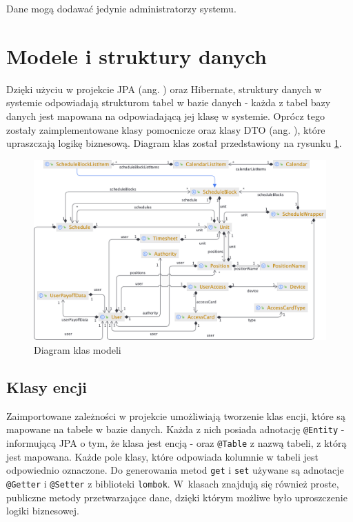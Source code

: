 Dane mogą dodawać jedynie administratorzy systemu.

\section{Modele i struktury danych}


Dzięki użyciu w projekcie JPA (ang. ) oraz Hibernate, struktury danych w systemie odpowiadają strukturom tabel w bazie danych - każda z tabel bazy danych jest mapowana na odpowiadającą jej klasę w systemie. Oprócz tego zostały zaimplementowane klasy pomocnicze oraz klasy DTO (ang. ), które upraszczają logikę biznesową. Diagram klas został przedstawiony na rysunku \ref{fig:entityDiagram}.

\begin{figure}
    \centering
    \includegraphics[width=\textwidth]{graf/classDiagram.png}
    \caption{Diagram klas modeli}
    \label{fig:entityDiagram}
\end{figure}

\subsection{Klasy encji}

Zaimportowane zależności w projekcie umożliwiają tworzenie klas encji, które są mapowane na tabele w bazie danych. Każda z nich posiada adnotację \texttt{@Entity} - informującą JPA o tym, że klasa jest encją - oraz \texttt{@Table} z nazwą tabeli, z którą jest mapowana. Każde pole klasy, które odpowiada kolumnie w tabeli jest odpowiednio oznaczone. Do generowania metod \texttt{get} i \texttt{set} używane są adnotacje \texttt{@Getter} i \texttt{@Setter} z biblioteki \texttt{lombok}. W~klasach znajdują się również proste, publiczne metody przetwarzające dane, dzięki którym możliwe było uproszczenie logiki biznesowej.

